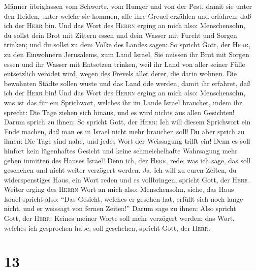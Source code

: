 Männer übriglassen vom Schwerte, vom Hunger und von der Pest, damit sie
unter den Heiden, unter welche sie kommen, alle ihre Greuel erzählen und
erfahren, daß ich der \textsc{Herr} bin.  Und das Wort
des \textsc{Herrn} erging an mich also:  Menschensohn, du
sollst dein Brot mit Zittern essen und dein Wasser mit Furcht und Sorgen
trinken;  und du sollst zu dem Volke des Landes sagen: So
spricht Gott, der \textsc{Herr}, zu den Einwohnern Jerusalems, zum Land
Israel. Sie müssen ihr Brot mit Sorgen essen und ihr Wasser mit
Entsetzen trinken, weil ihr Land von aller seiner Fülle entsetzlich
verödet wird, wegen des Frevels aller derer, die darin wohnen.
 Die bewohnten Städte sollen wüste und das Land öde
werden, damit ihr erfahret, daß ich der \textsc{Herr} bin!
 Und das Wort des \textsc{Herrn} erging an mich also:
 Menschensohn, was ist das für ein Sprichwort, welches
ihr im Lande Israel brauchet, indem ihr sprecht: Die Tage ziehen sich
hinaus, und es wird nichts aus allen Gesichten!  Darum
sprich zu ihnen: So spricht Gott, der \textsc{Herr}: Ich will diesem
Sprichwort ein Ende machen, daß man es in Israel nicht mehr brauchen
soll! Du aber sprich zu ihnen: Die Tage sind nahe, und jedes Wort der
Weissagung trifft ein!  Denn es soll hinfort kein
lügenhaftes Gesicht und keine schmeichelhafte Wahrsagung mehr geben
inmitten des Hauses Israel!  Denn ich, der \textsc{Herr},
rede; was ich sage, das soll geschehen und nicht weiter verzögert
werden. Ja, ich will zu euren Zeiten, du widerspenstiges Haus, ein Wort
reden und es vollbringen, spricht Gott, der \textsc{Herr}.
 Weiter erging des \textsc{Herrn} Wort an mich also:
 Menschensohn, siehe, das Haus Israel spricht also: ``Das
Gesicht, welches er gesehen hat, erfüllt sich noch lange nicht, und er
weissagt von fernen Zeiten!''  Darum sage zu ihnen: Also
spricht Gott, der \textsc{Herr}: Keines meiner Worte soll mehr verzögert
werden; das Wort, welches ich gesprochen habe, soll geschehen, spricht
Gott, der \textsc{Herr}.

\hypertarget{section-12}{%
\section{13}\label{section-12}}

